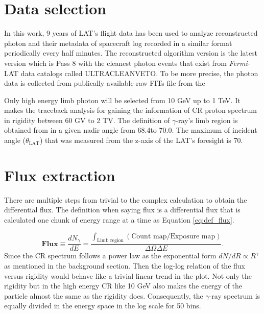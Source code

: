 \section{Data selection}
In this work, 9 years of LAT's flight data has been used
to analyze reconstructed photon and their metadata of spacecraft
log recorded in a similar format periodically every half minutes.
The reconstructed algorithm version is the latest version which is
Pass 8 with the cleanest photon events that exist from \textit{Fermi}-LAT
data catalogs called ULTRACLEANVETO. To be more precise, the photon 
data is collected from publically available raw FITs file from the 

Only high energy limb photon will be selected from 10 GeV up to 1 TeV.
It makes the traceback analysis for gaining the information of
CR proton spectrum in rigidity between 60 GV to 2 TV. The definition 
of $\gamma$-ray's limb region is obtained from \cite{FermiEarth09} in 
a given nadir angle from 68.4\textdegree to 70.0\textdegree. 
The maximum of incident angle ($\theta_\text{LAT}$) that was
measured from the z-axis of the LAT's foresight is 70\textdegree.


\section{Flux extraction}

There are multiple steps from trivial to the complex calculation to 
obtain the differential flux. The definition when saying flux 
is a differential flux that is calculated one
chunk of energy range at a time as Equation \ref{eq:def_flux}.

\begin{equation}
    \textbf{Flux} \equiv \frac{dN_\gamma}{dE} = \frac{\int_\text{Limb region}(\text{Count map}/\text{Exposure map})}{\Delta\Omega\Delta E}.
    \label{eq:def_flux}
\end{equation}
Since the CR spectrum follows a power law as the exponential form 
 $dN/dR \propto R^\gamma$ as mentioned in the background section.
Then the log-log relation of the flux versus rigidity would behave 
like a trivial linear trend in the plot. Not only the rigidity but 
in the high energy CR like 10 GeV also makes the energy of the particle
almost the same as the rigidity does. Consequently, the $\gamma$-ray
spectrum is equally divided in the energy space in the log scale for 
50 bins.

